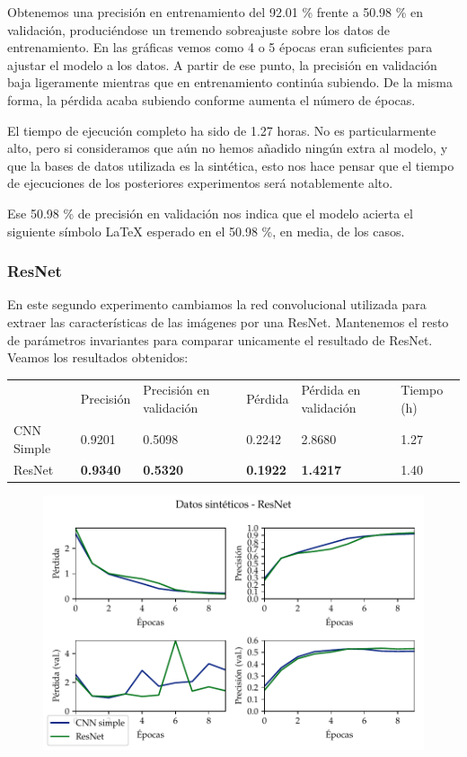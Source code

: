 \documentclass[a4paper, 20pt, dvipsnames]{article}
\begin{document}
Obtenemos una precisión en entrenamiento del 92.01 \% frente a 50.98 \% en
validación, produciéndose un tremendo sobreajuste sobre los datos de
entrenamiento. En las gráficas vemos como 4 o 5 épocas eran suficientes para
ajustar el modelo a los datos. A partir de ese punto, la precisión en validación
baja ligeramente mientras que en entrenamiento continúa subiendo. De la misma
forma, la pérdida acaba subiendo conforme aumenta el número de épocas.

El tiempo de ejecución completo ha sido de 1.27 horas. No es particularmente
alto, pero si consideramos que aún no hemos añadido ningún extra al modelo, y
que la bases de datos utilizada es la sintética, esto nos hace pensar que el
tiempo de ejecuciones de los posteriores experimentos será notablemente alto.

Ese 50.98 \% de precisión en validación nos indica que el modelo acierta el
siguiente símbolo \LaTeX{} esperado en el 50.98 \%, en media, de los casos.


\subsubsection{ResNet}
\label{exp:toy2}

En este segundo experimento cambiamos la red convolucional utilizada para
extraer las características de las imágenes por una ResNet. Mantenemos el resto
de parámetros invariantes para comparar unicamente el resultado de
ResNet. Veamos los resultados obtenidos:

\begin{table}[H]
	\centering
	\begin{tabular}{llllll}
		& Precisión       & Precisión en validación & Pérdida         & Pérdida en validación & Tiempo (h) \\ \cline{2-6} 
		CNN Simple & 0.9201          & 0.5098                  & 0.2242          & 2.8680                & 1.27       \\
		ResNet     & \textbf{0.9340} & \textbf{0.5320}         & \textbf{0.1922} & \textbf{1.4217}       & 1.40      
	\end{tabular}
\end{table}

\begin{figure}[H]
	\centering
	\includegraphics{fig/toy-2.pdf}
\end{figure}
\end{document}
